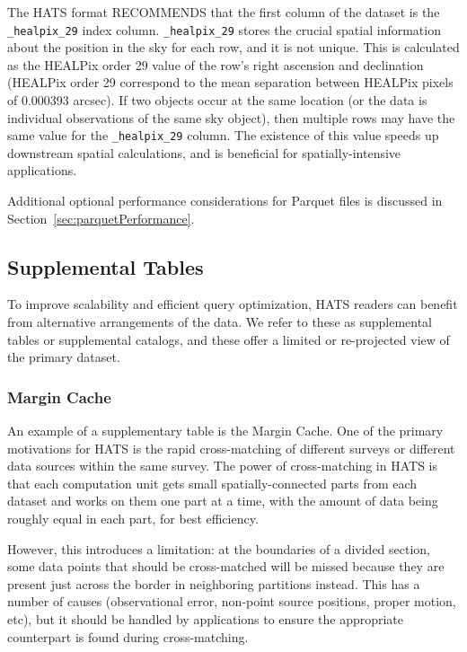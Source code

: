 \documentclass[11pt,a4paper]{ivoa}
\begin{document}
The HATS format RECOMMENDS that the first column of the dataset is the \texttt{\_healpix\_29} index column.  
\texttt{\_healpix\_29} stores the crucial spatial information about the position in the sky for each row, and it is not unique.
This is calculated as the HEALPix order 29 value of the row's right ascension and declination (HEALPix order 29 correspond to the mean separation between HEALPix pixels of 0.000393 arcsec). 
If two objects occur at the same location (or the data is individual observations of the same sky object), then multiple rows may have the same value for the \texttt{\_healpix\_29} column.
The existence of this value speeds up downstream spatial calculations, and is beneficial for spatially-intensive applications.

Additional optional performance considerations for Parquet files is discussed in Section~\ref{sec:parquetPerformance}.

\subsection{Supplemental Tables} \label{sec:supplemental}

To improve scalability and efficient query optimization, HATS readers can benefit from alternative arrangements of the data. 
We refer to these as supplemental tables or supplemental catalogs, and these offer a limited or re-projected view of the primary dataset.

\subsubsection{Margin Cache} \label{sec:margin}

An example of a supplementary table is the Margin Cache. One of the primary motivations for HATS is the rapid cross-matching of different surveys or different data sources within the same survey. 
The power of cross-matching in HATS is that each computation unit gets small spatially-connected parts from each dataset and works on them one part at a time,
with the amount of data being roughly equal in each part, for best efficiency.\par 

However, this introduces a limitation: at the boundaries of a divided section, some data points that should be cross-matched will be missed because they are present just across the border in neighboring partitions instead.
This has a number of causes (observational error, non-point source positions, proper motion, etc), but it should be handled by applications to ensure the appropriate counterpart is found during cross-matching.\par
\end{document}
